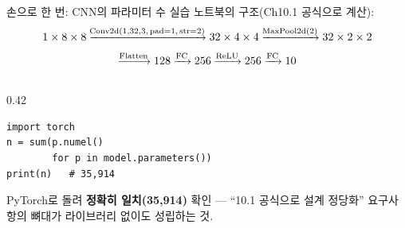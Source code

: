 \begin{frame}[fragile]{손으로 한 번: CNN의 파라미터 수}
  실습 노트북의 구조(Ch10.1 공식으로 계산):
  \[
  \small 1\times8\times8
  \xrightarrow{\text{Conv2d}(1,32,3,\,\text{pad}=1,\,\text{str}=2)}
  32\times4\times4
  \xrightarrow{\text{MaxPool2d}(2)}
  32\times2\times2
  \]
  \[
  \small \xrightarrow{\text{Flatten}} 128
  \xrightarrow{\text{FC}} 256
  \xrightarrow{\text{ReLU}} 256
  \xrightarrow{\text{FC}} 10
  \]
  \small
  \begin{columns}[T]
    \begin{column}{0.42\textwidth}
      \begin{lstlisting}
import torch
n = sum(p.numel()
        for p in model.parameters())
print(n)   # 35,914
\end{lstlisting}
      {\footnotesize PyTorch로 돌려 \textbf{정확히 일치(35,914)}
      확인 — ``10.1 공식으로 설계 정당화'' 요구사항의 뼈대가
      라이브러리 없이도 성립하는 것.}
    \end{column}
  \end{columns}
\end{frame}
